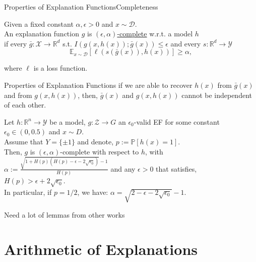 \documentclass[10pt, aspectratio=169]{beamer}
\newcommand{\R}{\mathbb{R}}
\begin{document}
	\begin{frame}[t]{Properties of Explanation Functions}{Completeness}
		\begin{definition}
			Given a fixed constant $\alpha,\epsilon>0$ and $x\sim \mathcal{D}$.\\
			An explanation function $g$ is \underline{$(\epsilon,\alpha)$-complete} w.r.t. a model $h$\\
			if every $\bar{g}:\mathcal{X}\to\R^d$ s.t. $I(g(x,h(x));\bar{g}(x))\leqslant\epsilon$ and every $s:\R^d\to\mathcal{Y}$
			$$
				\mathbb{E}_{x\sim\mathcal{D}}\left[ \ell
					\left(
						s(\bar{g}(x)), h(x)
					\right)
				\right]\geqslant\alpha,
			$$
			
			where $\ell$ is a loss function.
		\end{definition}
	\end{frame}
	
	\begin{frame}{Properties of Explanation Functions}
		if we are able to recover $h(x)$ from $\bar{g}(x)$ and from $g(x, h(x))$, then, $\bar{g}(x)$ and $g(x, h(x))$ cannot be independent of each other.
		\begin{theorem}
			Let $h: \mathbb{R}^n \rightarrow \mathcal{Y}$ be a model, $g: \mathcal{Z} \rightarrow G$ an $\epsilon_0$-valid EF for some constant $\epsilon_0 \in(0,0.5)$ and $x \sim D$.\\
			Assume that $Y=\{ \pm 1\}$ and denote, $p:=\mathbb{P}[h(x)=1]$.\\
			Then, $g$ is $(\epsilon, \alpha)$-complete with respect to $h$, with $\alpha:=\frac{\sqrt{1+H(p)\left(H(p)-\epsilon-2 \sqrt{\epsilon_0}\right)}-1}{H(p)}$ and any $\epsilon>0$ that satisfies, $H(p)>\epsilon+2 \sqrt{\epsilon_0}$.\\
			In particular, if $p=1 / 2$, we have: $\alpha=\sqrt{2-\epsilon-2 \sqrt{\epsilon_0}}-1$.
		\end{theorem}
		Need a lot of lemmas from other works
	\end{frame}
	
	
	\section{Arithmetic of Explanations}
\end{document}
